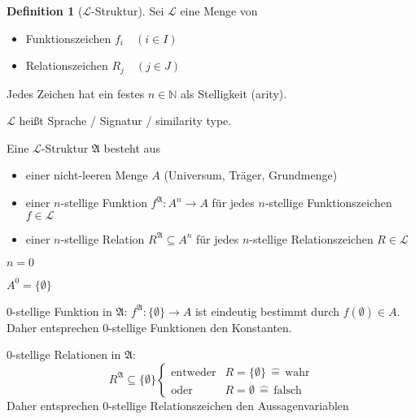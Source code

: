 \documentclass[12pt,parskip=full]{scrartcl}
\newcommand{\setN}{\mathbb{N}}
\newcommand{\heading}{\underline}
\theoremstyle{definition}
\newtheorem{definition}[theorem]{Definition}
\begin{document}
	\begin{definition}[$\mathcal{L}$-Struktur]
		Sei $\mathcal{L}$ eine Menge von
		\begin{itemize}
			\item Funktionszeichen $f_i \quad (i \in I)$
			\item Relationszeichen $R_j \quad (j \in J)$
		\end{itemize}
		
		Jedes Zeichen hat ein festes $n \in \setN$ als Stelligkeit (arity).
		
		$\mathcal{L}$ heißt Sprache / Signatur / similarity type.
		
		Eine $\mathcal{L}$-Struktur $\mathfrak{A}$ besteht aus
		\begin{itemize}
			\item einer nicht-leeren Menge $A$ (Universum, Träger, Grundmenge)
			\item einer $n$-stellige Funktion $f^\mathfrak{A}: A^n \to A$ für jedes $n$-stellige Funktionszeichen $f \in \mathcal{L}$
			\item einer $n$-stellige Relation $R^\mathfrak{A} \subseteq A^n$ für jedes $n$-stellige Relationszeichen $R \in \mathcal{L}$
		\end{itemize}
	
		\heading{$n = 0$}
		
		$A^0 = \{ \emptyset \}$
		
		$0$-stellige Funktion in $\mathfrak{A}$: $f^\mathfrak{A}: \{ \emptyset \} \to A$ ist eindeutig bestimmt durch $f(\emptyset) \in A$. Daher entsprechen $0$-stellige Funktionen den Konstanten.
		
		$0$-stellige Relationen in $\mathfrak{A}$:
		\begin{equation*}
			R^\mathfrak{A} \subseteq \{ \emptyset \} \begin{cases}
				\text{entweder} & R = \{ \emptyset \} \,\hat{=}\, \text{wahr}\\
				\text{oder} & R = \emptyset \,\hat{=}\, \text{falsch}
			\end{cases}
		\end{equation*}
		Daher entsprechen $0$-stellige Relationszeichen den Aussagenvariablen
	\end{definition}
\end{document}
